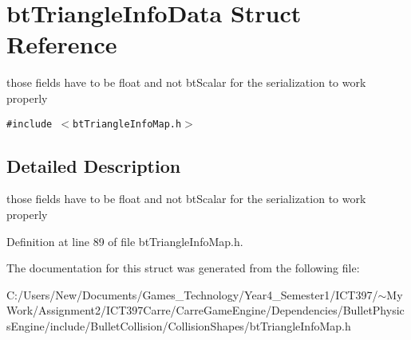 \hypertarget{structbt_triangle_info_data}{
\section{btTriangleInfoData Struct Reference}
\label{structbt_triangle_info_data}
}
those fields have to be float and not btScalar for the serialization to work properly  


{\tt \#include $<$btTriangleInfoMap.h$>$}



\subsection{Detailed Description}
those fields have to be float and not btScalar for the serialization to work properly 

Definition at line 89 of file btTriangleInfoMap.h.

The documentation for this struct was generated from the following file:\begin{CompactItemize}
\item 
C:/Users/New/Documents/Games\_\-Technology/Year4\_\-Semester1/ICT397/$\sim$My Work/Assignment2/ICT397Carre/CarreGameEngine/Dependencies/BulletPhysicsEngine/include/BulletCollision/CollisionShapes/btTriangleInfoMap.h\end{CompactItemize}
